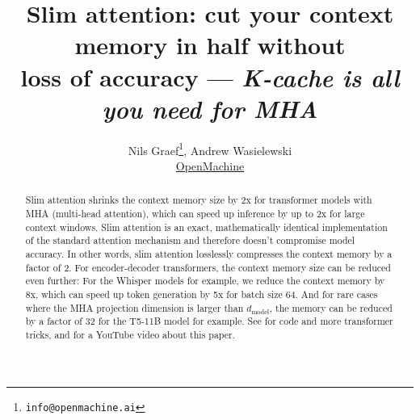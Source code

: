 \documentclass{article}
\title{Slim attention: cut your context memory in half without \\ loss of accuracy --- \emph{K-cache is all you need for MHA}}
\author{Nils Graef\thanks{\texttt{info@openmachine.ai}}, Andrew Wasielewski \\
  \href{https://openmachine.ai}{OpenMachine}}
\begin{document}
 \maketitle

\begin{abstract}
Slim attention shrinks the context memory size by 2x for transformer models with MHA (multi-head attention), which can speed up inference by up to 2x for large context windows. Slim attention is an exact, mathematically identical implementation of the standard attention mechanism and therefore doesn’t compromise model accuracy. In other words, slim attention losslessly compresses the context memory by a factor of 2. For encoder-decoder transformers, the context memory size can be reduced even further: For the Whisper models for example, we reduce the context memory by 8x, which can speed up token generation by 5x for batch size 64. And for rare cases where the MHA projection dimension is larger than $d_{\text{model}}$, the memory can be reduced by a factor of 32 for the T5-11B model for example. See \citep{tricks} for code and more transformer tricks, and \citep{slim-video} for a YouTube video about this paper.
\end{abstract}
\end{document}
